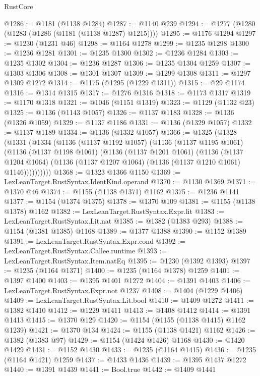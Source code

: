 \begin{lexlean}{RustCore}
\begin{coremodule}
@1286 := @1181 (@1138 @1284)
@1287 := @1140 @239
@1294 := @1277 (@1280 (@1283 (@1286 (@1181 (@1138 @1287) @1215))))
@1295 := @1176 @1294
@1297 := @1230 (@1231 @46)
@1298 := @1164 @1278
@1299 := @1235 @1298
@1300 := @1236 @1281
@1301 := @1235 @1300
@1302 := @1236 @1284
@1303 := @1235 @1302
@1304 := @1236 @1287
@1306 := @1235 @1304 @1259
@1307 := @1303 @1306
@1308 := @1301 @1307
@1309 := @1299 @1308
@1311 := @1297 @1309 @1272
@1314 := @1175 (@1295 (@1229 @1311))
@1315 := @29 @1174
@1316 := @1314 @1315
@1317 := @1276 @1316
@1318 := @1173 @1317
@1319 := @1170 @1318
@1321 := @1046 (@1151 @1319)
@1323 := @1129 (@1132 @23)
@1325 := @1136 (@1143 @1057)
@1326 := @1137 @1183
@1328 := @1136 (@1326 @1059)
@1329 := @1137 @1186
@1331 := @1136 (@1329 @1057)
@1332 := @1137 @1189
@1334 := @1136 (@1332 @1057)
@1366 := @1325
    (@1328
      (@1331
        (@1334
          (@1136
            (@1137 @1192 @1057)
            (@1136
              (@1137 @1195 @1061)
              (@1136
                (@1137 @1198 @1061)
                (@1136
                  (@1137 @1201 @1061)
                  (@1136
                    (@1137 @1204 @1064)
                    (@1136 (@1137 @1207 @1064) (@1136 (@1137 @1210 @1061) @1146))))))))))
@1368 := @1323 @1366 @1150
@1369 := LexLeanTarget.RustSyntax.IdentKind.operand
@1370 := @1130 @1369
@1371 := @1370 @46
@1374 := @1155 (@1138 @1371) @1162
@1375 := @1236 @1141
@1377 := @1154 (@1374 @1375)
@1378 := @1370 @109
@1381 := @1155 (@1138 @1378) @1162
@1382 := LexLeanTarget.RustSyntax.Expr.lit
@1383 := LexLeanTarget.RustSyntax.Lit.nat
@1385 := @1382 (@1383 @293)
@1388 := @1154 (@1381 @1385) @1168
@1389 := @1377 @1388
@1390 := @1152 @1389
@1391 := LexLeanTarget.RustSyntax.Expr.cond
@1392 := LexLeanTarget.RustSyntax.Callee.runtime
@1393 := LexLeanTarget.RustSyntax.Item.natEq
@1395 := @1230 (@1392 @1393)
@1397 := @1235 (@1164 @1371)
@1400 := @1235 (@1164 @1378) @1259
@1401 := @1397 @1400
@1403 := @1395 @1401 @1272
@1404 := @1391 @1403
@1406 := LexLeanTarget.RustSyntax.Expr.not @1237
@1408 := @1404 (@1229 @1406)
@1409 := LexLeanTarget.RustSyntax.Lit.bool
@1410 := @1409 @1272
@1411 := @1382 @1410
@1412 := @1229 @1411
@1413 := @1408 @1412
@1414 := @1391 @1413
@1415 := @1370 @129
@1420 := @1154 (@1155 (@1138 @1415) @1162 @1239)
@1421 := @1370 @134
@1424 := @1155 (@1138 @1421) @1162
@1426 := @1382 (@1383 @97)
@1429 := @1154 (@1424 @1426) @1168
@1430 := @1420 @1429
@1431 := @1152 @1430
@1433 := @1235 (@1164 @1415)
@1436 := @1235 (@1164 @1421) @1259
@1437 := @1433 @1436
@1439 := @1395 @1437 @1272
@1440 := @1391 @1439
@1441 := Bool.true
@1442 := @1409 @1441

\end{coremodule}
\end{lexlean}
